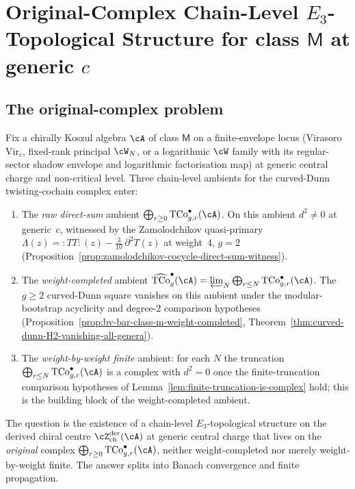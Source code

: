 \chapter{Original-Complex Chain-Level $E_3$-Topological Structure
for class $\mathsf{M}$ at generic $c$}
\label{ch:topologization-class-m-original-complex}

\section*{The original-complex problem}

Fix a chirally Koszul algebra $\cA$ of class $\mathsf{M}$ on a
finite-envelope locus (Virasoro~$\mathrm{Vir}_c$, fixed-rank
principal $\cW_N$, or a logarithmic $\cW$ family with its
regular-sector shadow envelope and logarithmic factorisation map) at
generic central charge and non-critical level. Three chain-level
ambients for the curved-Dunn twisting-cochain complex enter:
\begin{enumerate}[nosep]
\item The \emph{raw direct-sum} ambient
 $\bigoplus_{r \ge 0} \mathrm{TCo}^{\bullet}_{g, r}(\cA)$. On this
 ambient $d^2 \neq 0$ at generic~$c$, witnessed by the
 Zamolodchikov quasi-primary $\Lambda(z) = :T T:(z) -
 \tfrac{3}{10}\, \partial^2 T(z)$ at weight~$4$, $g = 2$
 (Proposition~\ref{prop:zamolodchikov-cocycle-direct-sum-witness}).
\item The \emph{weight-completed} ambient
 $\widehat{\mathrm{TCo}}^{\bullet}_g(\cA) =
 \varprojlim_N \bigoplus_{r \le N} \mathrm{TCo}^{\bullet}_{g,r}(\cA)$.
 The $g\ge2$ curved-Dunn square vanishes on this ambient under
 the modular-bootstrap acyclicity and degree-$2$ comparison
 hypotheses
 (Proposition~\ref{prop:bv-bar-class-m-weight-completed},
 Theorem~\ref{thm:curved-dunn-H2-vanishing-all-genera}).
\item The \emph{weight-by-weight finite} ambient: for each $N$ the
 truncation $\bigoplus_{r \le N} \mathrm{TCo}^{\bullet}_{g, r}(\cA)$
 is a complex with $d^2 = 0$ once the
 finite-truncation comparison hypotheses of
 Lemma~\ref{lem:finite-truncation-is-complex} hold; this is the
 building block of the weight-completed ambient.
\end{enumerate}
The question is the existence of a chain-level $E_3$-topological
structure on the derived chiral centre
$\cZ^{\mathrm{der}}_{\mathrm{ch}}(\cA)$ at generic central charge that
lives on the \emph{original} complex
$\bigoplus_{r \ge 0} \mathrm{TCo}^{\bullet}_{g, r}(\cA)$, neither
weight-completed nor merely weight-by-weight finite. The answer splits
into Banach convergence and finite propagation.

